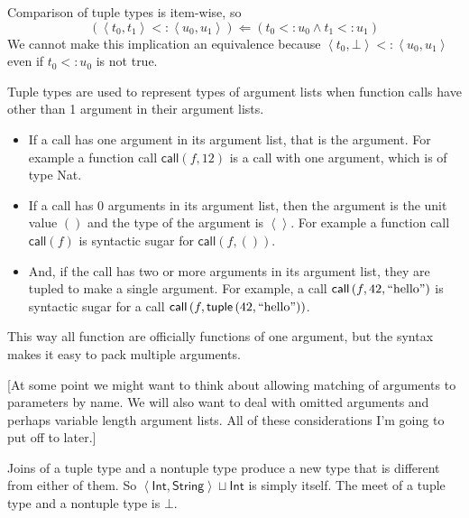 \documentclass[12pt]{article}
\begin{document}
Comparison of tuple types is item-wise, so%
\begin{equation*}
\left( \left\langle t_{0},t_{1}\right\rangle <:\left\langle
u_{0},u_{1}\right\rangle \right) \Leftarrow \left( t_{0}<:u_{0}\wedge
t_{1}<:u_{1}\right)
\end{equation*}%
We cannot make this implication an equivalence because $\left\langle
t_{0},\bot \right\rangle <:\left\langle u_{0},u_{1}\right\rangle $ even if $%
t_{0}<:u_{0}$ is not true.

Tuple types are used to represent types of argument lists when function
calls have other than 1 argument in their argument lists.

\begin{itemize}
\item If a call has one argument in its argument list, that is the argument.
For example a function call $\mathsf{call}(f,12)$ is a call with one
argument, which is of type \textsf{Nat}.

\item If a call has 0 arguments in its argument list, then the argument is
the unit value $()$ and the type of the argument is $\left\langle
{}\right\rangle $. For example a function call $\mathsf{call}(f)$ is
syntactic sugar for $\mathsf{call}(f,())$.

\item And, if the call has two or more arguments in its argument list, they
are tupled to make a single argument. For example, a call $\mathsf{call}%
\left( f,42,\text{\textquotedblleft hello\textquotedblright }\right) $ is
syntactic sugar for a call $\mathsf{call}\left( f,\mathsf{tuple}\left( 42,%
\text{\textquotedblleft hello\textquotedblright }\right) \right) $.
\end{itemize}

\noindent This way all function are officially functions of one argument,
but the syntax makes it easy to pack multiple arguments.

[At some point we might want to think about allowing matching of arguments
to parameters by name. We will also want to deal with omitted arguments and
perhaps variable length argument lists. All of these considerations I'm
going to put off to later.]

Joins of a tuple type and a nontuple type produce a new type that is
different from either of them. So $\left\langle \mathsf{Int},\mathsf{String}%
\right\rangle \sqcup \mathsf{Int}$ is simply itself. The meet of a tuple
type and a nontuple type is $\bot $.
\end{document}
